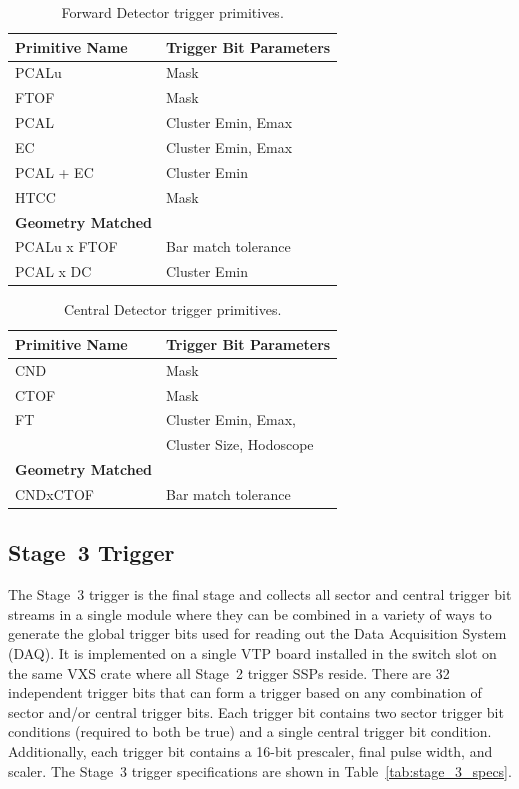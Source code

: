 \begin{table}
\begin{center}
	\begin{tabular}{| l | l |}
		\hline \hline
		Primitive Name			& Trigger Bit Parameters	\\
		\hline
		PCALu     			& Mask				\\
		FTOF    			& Mask				\\
		PCAL				& Cluster Emin, Emax		\\
		EC 				& Cluster Emin, Emax		\\
		PCAL + EC			& Cluster Emin			\\
		HTCC				& Mask				\\
		{\bf Geometry Matched}		&				\\
		PCALu x FTOF			& Bar match tolerance		\\
		PCAL x DC				& Cluster Emin			\\
		\hline \hline
	\end{tabular}
\end{center}
\caption{Forward Detector trigger primitives.}
\label{tab:fd_trig_primitives}
\end{table}

\begin{table}
\begin{center}
	\begin{tabular}{| l | l |}
		\hline \hline
		Primitive Name			& Trigger Bit Parameters	\\
		\hline
		CND     			& Mask				\\
		CTOF    			& Mask				\\
		FT				& Cluster Emin, Emax, 		\\
						& Cluster Size, Hodoscope	\\
		{\bf Geometry Matched}		&				\\
		CNDxCTOF			& Bar match tolerance		\\
		\hline \hline
	\end{tabular}
\end{center}
\caption{Central Detector trigger primitives.}
\label{tab:cd_trig_primitives}
\end{table}

\subsection{Stage~3 Trigger}

The Stage~3 trigger is the final stage and collects all sector and central trigger bit streams in a single
module where they can be combined in a variety of ways to generate the global trigger bits used for reading
out the Data Acquisition System (DAQ). It is implemented on a single VTP board installed in the switch slot on
the same VXS crate where all Stage~2 trigger SSPs reside. There are 32 independent trigger bits that can
form a trigger based on any combination of sector and/or central trigger bits. Each trigger bit contains two
sector trigger bit conditions (required to both be true) and a single central trigger bit condition. Additionally,
each trigger bit contains a 16-bit prescaler, final pulse width, and scaler. The Stage~3 trigger specifications
are shown in Table~\ref{tab:stage_3_specs}.

